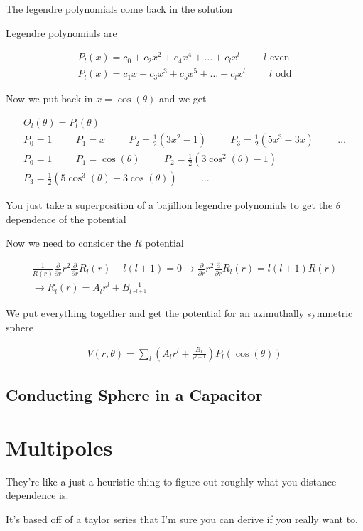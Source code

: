 \documentclass[fleqn]{report}
\newcommand{\hp}{\hspace{1cm}}
\newcommand{\del}{\partial}
\newcommand{\equations} [1] {
\begin{gather*}
#1
\end{gather*}
}
\begin{document}
The legendre polynomials come back in the solution 

Legendre polynomials are 
\equations{
    P_l(x) = c_0 + c_2 x^2 + c_4 x^4 + \ldots + c_l x^l
    \hp 
    l \textrm{ even}
    \\
    P_l(x) = c_1 x + c_3 x^3 + c_5 x^5 + \ldots + c_l x^l
    \hp 
    l \textrm{ odd}
}

Now we put back in $x = \cos(\theta)$ and we get 

\equations{
    \Theta_l(\theta) = P_l(\theta)
    \\
    P_0 = 1
    \hp 
    P_1 = x
    \hp 
    P_2 = \frac{1}{2} (3x^2 - 1)
    \hp 
    P_3 = \frac{1}{2} (5x^3 - 3x)
    \hp 
    \ldots 
    \\
    P_0 = 1
    \hp 
    P_1 = \cos(\theta)
    \hp 
    P_2 = \frac{1}{2} (3 \cos^2(\theta) - 1)
    \\
    P_3 = \frac{1}{2} (5 \cos^3(\theta) - 3 \cos(\theta))
    \hp 
    \ldots 
}

You just take a superposition of a bajillion legendre polynomials to get 
the $\theta$ dependence of the potential 

Now we need to consider the $R$ potential 

\equations{
    \frac{1}{R(r)}
    \frac{\del}{\del r} 
    r^2 
    \frac{\del}{\del r}
    R_l(r) 
    -
    l(l+1)
    =
    0
    \rightarrow 
    \frac{\del}{\del r} 
    r^2 
    \frac{\del}{\del r}
    R_l(r) 
    =
    l(l+1)
    R(r)
    \\
    \rightarrow 
    R_l(r)
    =
    A_l r^l + B_l \frac{1}{r^{l + 1}}
}

We put everything together and get the potential for an azimuthally 
symmetric sphere 

\equations{
    V(r, \theta)
    =
    \sum_l
    \left(
        A_l r^l 
        +
        \frac{B_l}{r^{l + 1}}
    \right)
    P_l(\cos(\theta))
}

\subsection{Conducting Sphere in a Capacitor}

\section{Multipoles}
They're like a just a heuristic thing to figure out roughly what you 
distance dependence is.

It's based off of a taylor series that I'm sure you can derive if you really 
want to. 
\end{document}

